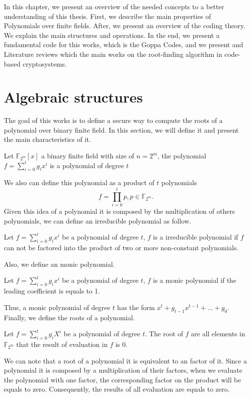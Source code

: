 In this chapter, we present an overview of the needed concepts to a better understanding of this thesis. First, we describe the main properties of Polynomials over finite fields. After, we present an overview of the coding theory. We explain the main structures and operations. In the end, we present a fundamental code for this works, which is the Goppa Codes, and we present and Literature reviews which the main works on the root-finding algorithm in code-based cryptosystems. 

\section{Algebraic structures}
The goal of this works is to define a secure way to compute the roots of a polynomial over binary finite field. In this section, we will define it and present the main characteristics of it.
\begin{definition}
Let $\mathbb{F}_{2^m}[x]$ a binary finite field with size of $n=2^m$, the polynomial $f = \sum_{i=0}^{t}{g_{i}x^{i}}$ is a polynomial of degree $t$
\end{definition}
We also can define this polynomial as a product of $t$ polynomials
\begin{equation*}
    f = \prod_{i=0}^{t}{p}, p \in \mathbb{F}_{2^m}.
\end{equation*}
Given this idea of a polynomial it is composed by the multiplication of others polynomials, we can define an irreducible polynomial as follow.
\begin{definition}
Let $f = \sum_{i=0}^{t}{g_{i}x^{i}}$ be a polynomial of degree $t$, $f$ is a irreducible polynomial if $f$ can not be factored into the product of two or more non-constant polynomials.
\end{definition}
Also, we define an monic polynomial.
\begin{definition}
Let $f = \sum_{i=0}^{t}{g_{i}x^{i}}$ be a polynomial of degree $t$, $f$ is a monic polynomial if the leading coefficient is equals to 1. 
\end{definition}
Thus, a monic polynomial of degree $t$ has the form $x^t + g_{t-1}x^{t-1} + \dots + g_0$. Finally, we define the roots of a polynomial.
\begin{definition}
Let $f = \sum_{i=0}^{t}{g_{i}X^{i}}$ be a polynomial of degree $t$. The root of $f$ are all elements in $\mathbb{F}_{2^m}$ that the result of evaluation in $f$ is 0.
\end{definition}
We can note that a root of a polynomial it is equivalent to an factor of it. Since a polynomial it is composed by a multiplication of their factors, when we evaluate the polynomial with one factor, the corresponding factor on the product will be equals to zero. Consequently, the results of all evaluation are equals to zero.

